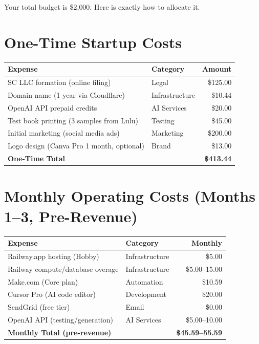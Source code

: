 \documentclass[12pt, letterpaper, oneside]{book}
\begin{document}
Your total budget is \$2{,}000. Here is exactly how to allocate it.

\section{One-Time Startup Costs}

\begin{table}[H]
\centering
\begin{tabularx}{\textwidth}{Xlr}
\toprule
\textbf{Expense} & \textbf{Category} & \textbf{Amount} \\
\midrule
SC LLC formation (online filing) & Legal & \$125.00 \\
Domain name (1 year via Cloudflare) & Infrastructure & \$10.44 \\
OpenAI API prepaid credits & AI Services & \$20.00 \\
Test book printing (3 samples from Lulu) & Testing & \$45.00 \\
Initial marketing (social media ads) & Marketing & \$200.00 \\
Logo design (Canva Pro 1 month, optional) & Brand & \$13.00 \\
\midrule
\textbf{One-Time Total} & & \textbf{\$413.44} \\
\bottomrule
\end{tabularx}
\end{table}

\section{Monthly Operating Costs (Months 1--3, Pre-Revenue)}

\begin{table}[H]
\centering
\begin{tabularx}{\textwidth}{Xlr}
\toprule
\textbf{Expense} & \textbf{Category} & \textbf{Monthly} \\
\midrule
Railway.app hosting (Hobby) & Infrastructure & \$5.00 \\
Railway compute/database overage & Infrastructure & \$5.00--15.00 \\
Make.com (Core plan) & Automation & \$10.59 \\
Cursor Pro (AI code editor) & Development & \$20.00 \\
SendGrid (free tier) & Email & \$0.00 \\
OpenAI API (testing/generation) & AI Services & \$5.00--10.00 \\
\midrule
\textbf{Monthly Total (pre-revenue)} & & \textbf{\$45.59--55.59} \\
\bottomrule
\end{tabularx}
\end{table}
\end{document}
